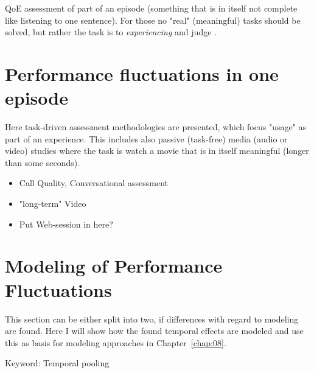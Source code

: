 QoE assessment of part of an episode (something that is in itself not complete like listening to one sentence).
For those no "real" (meaningful) tasks should be solved, but rather the task is to \textit{experiencing} and judge \cite{egger_qoe_2014}.

\section{Performance fluctuations in one episode}
Here task-driven assessment methodologies are presented, which focus "usage" as part of an experience.
This includes also passive (task-free) media (audio or video) studies where the task is watch a movie that is in itself meaningful (longer than some seconds).

\begin{itemize}
\item Call Quality, Conversational assessment
\item "long-term" Video
\item Put Web-session in here?
\end{itemize}


\section{Modeling of Performance Fluctuations}
This section can be either split into two, if differences with regard to modeling are found.
Here I will show how the found temporal effects are modeled and use this as basis for modeling approaches in Chapter~\ref{chap:08}.

Keyword: Temporal pooling

